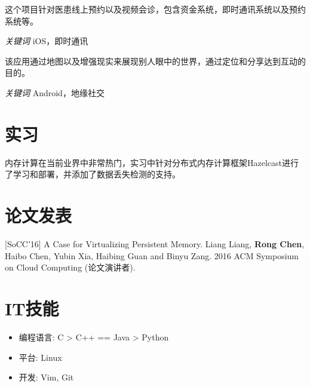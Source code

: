 \documentclass{resume}
\begin{document}
这个项目针对医患线上预约以及视频会诊，包含资金系统，即时通讯系统以及预约系统等。

\textit{关键词} iOS，即时通讯

该应用通过地图以及增强现实来展现别人眼中的世界，通过定位和分享达到互动的目的。

\textit{关键词} Android，地缘社交



\section{实习}
内存计算在当前业界中非常热门，实习中针对分布式内存计算框架Hazelcast进行了学习和部署，并添加了数据丢失检测的支持。

\section{论文发表}
[SoCC'16] A Case for Virtualizing Persistent Memory. Liang Liang, \textbf{Rong Chen}, Haibo Chen, Yubin Xia, Haibing Guan and Binyu Zang. 2016 ACM Symposium on Cloud Computing (论文演讲者).

\section{IT技能}
\begin{itemize}[parsep=0.5ex]
  \item 编程语言: C > C++ == Java > Python
  \item 平台: Linux
  \item 开发: Vim, Git
\end{itemize}

%
%
\end{document}
